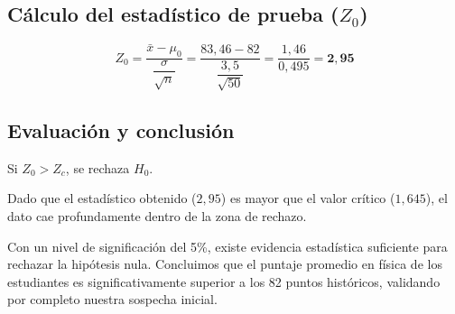 \subsection{Cálculo del estadístico de prueba ($Z_0$)}
\begin{equation*}
  Z_0 = \frac{\bar{x} - \mu_0}{\dfrac{\sigma}{\sqrt{n}}}
      = \frac{83{,}46 - 82}{\dfrac{3{,}5}{\sqrt{50}}}
      = \frac{1{,}46}{0{,}495} = \mathbf{2{,}95}
\end{equation*}


\subsection{Evaluación y conclusión}
 Si $Z_0 > Z_c$, se rechaza $H_0$.

 Dado que el estadístico obtenido ($2{,}95$) es mayor que el valor
crítico ($1{,}645$), el dato cae profundamente dentro de la zona de rechazo.

 Con un nivel de significación del 5\%, existe evidencia
estadística suficiente para rechazar la hipótesis nula. Concluimos que el puntaje promedio en
física de los estudiantes es significativamente superior a los 82 puntos históricos, validando
por completo nuestra sospecha inicial.

